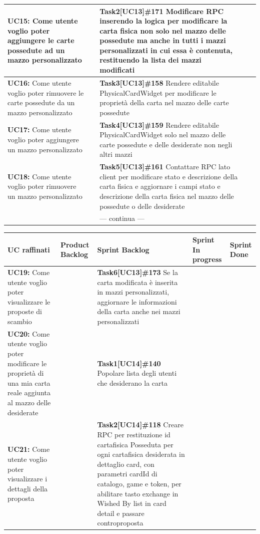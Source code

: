 \documentclass[a4paper, oneside]{article}
\begin{document}
\begin{landscape}
\begin{tabular}{ | p{6.5cm} | p{3cm} | p{8cm} | p{2.9cm} | p{2.4cm}| }
            \textbf{UC15:}  Come utente voglio poter aggiungere le carte possedute ad un mazzo personalizzato    & & \textbf{Task2[UC13]\#171} Modificare RPC inserendo la logica per modificare la carta fisica non solo nel mazzo delle possedute ma anche in tutti i mazzi personalizzati in cui essa è contenuta, restituendo la lista dei mazzi modificati  & & \\ \hline
            \textbf{UC16:}  Come utente voglio poter rimuovere le carte possedute da un mazzo personalizzato  & & \textbf{Task3[UC13]\#158} Rendere editabile PhysicalCardWidget per modificare le proprietà della carta nel mazzo delle carte possedute  & & \\ \hline
            \textbf{UC17:}  Come utente voglio poter aggiungere un mazzo personalizzato   & & \textbf{Task4[UC13]\#159} Rendere editabile PhysicalCardWidget solo nel mazzo delle carte possedute e delle desiderate non negli altri mazzi  & & \\ \hline
            \textbf{UC18:}  Come utente voglio poter rimuovere un mazzo personalizzato   & & \textbf{Task5[UC13]\#161} Contattare RPC lato client per modificare stato e descrizione della carta fisica e aggiornare i campi stato e descrizione della carta fisica nel mazzo delle possedute o delle desiderate  & & \\ \hline
            & & --- continua --- & & \\
            \hline
        \end{tabular}
        \newpage
        \small
        \noindent
        \def\arraystretch{2}%
        \begin{tabular}{ | p{6.5cm} | p{3cm} | p{8cm} | p{2.9cm} | p{2.4cm}| }
            \hline
            \textbf{UC raffinati}
            & \textbf{Product Backlog}
            & \textbf{Sprint Backlog}
            & \textbf{Sprint In progress}
            & \textbf{Sprint Done} \\
            \hline
            \hline
            \textbf{UC19:}  Come utente voglio poter visualizzare le proposte di scambio & & \textbf{Task6[UC13]\#173} Se la carta modificata è inserita in mazzi personalizzati, aggiornare le informazioni della carta anche nei mazzi personalizzati  & & \\ \hline
            \textbf{UC20:}  Come utente voglio poter modificare le proprietà di una mia carta reale aggiunta al mazzo delle desiderate & & \textbf{Task1[UC14]\#140} Popolare lista degli utenti che desiderano la carta  & & \\ \hline
            \textbf{UC21:}  Come utente voglio poter visualizzare i dettagli della proposta & & \textbf{Task2[UC14]\#118} Creare RPC per restituzione id cartafisica Posseduta per ogni cartafisica desiderata in dettaglio card, con parametri cardId di catalogo, game e token, per abilitare tasto exchange in Wished By list in card detail e passare controproposta  & & \\ \hline

\end{tabular}
\end{landscape}
\end{document}
